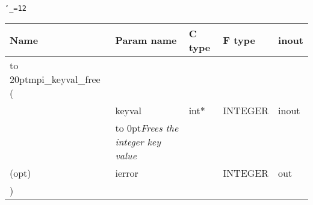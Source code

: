 \begingroup\tt\catcode`\_=12
\begin{tabular}{lllll}
\toprule
\textrm{Name}&\textrm{Param name}&\textrm{C type}&\textrm{F type}&\textrm{inout}\\
\midrule
\hbox to 20pt{mpi_keyval_free (\hss} \\
&keyval&int*&INTEGER&inout\\ [-3pt]
&\hbox to 0pt{\footnotesize\sl Frees the integer key value\hss}\\
(opt)&ierror&&INTEGER&out\\
)\\
\bottomrule
\end{tabular}
\endgroup

